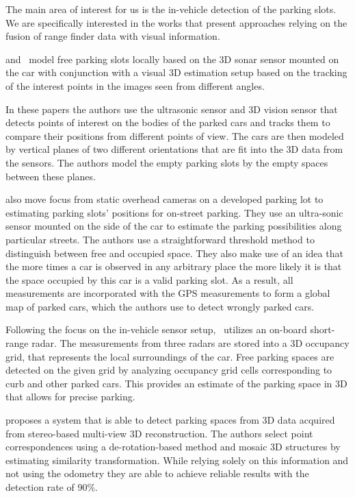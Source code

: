 The main area of interest for us is the in-vehicle detection of the parking
slots. We are specifically interested in the works that present approaches
relying on the fusion of range finder data with visual information.

\citet{fintyelvestri} and~\citet{abadvestri} model free parking slots locally
based on the 3D sonar sensor mounted on the car with conjunction with a visual
3D estimation setup based on the tracking of the interest points in the images
seen from different angles.

In these papers the authors use the ultrasonic sensor and 3D vision sensor
that detects points of interest on the bodies of the parked cars and tracks
them to compare their positions from different points of view. The cars are
then modeled by vertical planes of two different orientations that are fit
into the 3D data from the sensors. The authors model the empty parking slots
by the empty spaces between these planes.

\citet{vladimircoric} also move focus from static overhead cameras on a
developed parking lot to estimating parking slots' positions for on-street
parking. They use an ultra-sonic sensor mounted on the side of the car to
estimate the parking possibilities along particular streets. The authors use a
straightforward threshold method to distinguish between free and occupied
space. They also make use of an idea that the more times a car is observed in
any arbitrary place the more likely it is that the space occupied by this car
is a valid parking slot. As a result, all measurements are incorporated with
the GPS measurements to form a global map of parked cars, which the authors
use to detect wrongly parked cars.

Following the focus on the in-vehicle sensor setup,~\citet{schmid11} utilizes
an on-board short-range radar. The measurements from three radars are stored
into a 3D occupancy grid, that represents the local surroundings of the car.
Free parking spaces are detected on the given grid by analyzing occupancy grid
cells corresponding to curb and other parked cars. This provides an estimate
of the parking space in 3D that allows for precise parking.

\citet{suhr10} proposes a system that is able to detect parking spaces from 3D
data acquired from stereo-based multi-view 3D reconstruction. The authors
select point correspondences using a de-rotation-based method and mosaic 3D
structures by estimating similarity transformation. While relying solely on
this information and not using the odometry they are able to achieve reliable
results with the detection rate of 90\%.

